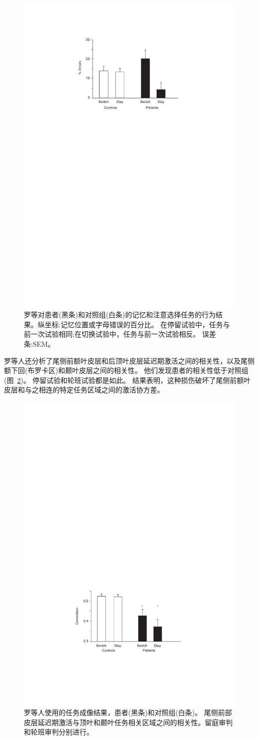 \begin{figure}[!htb]
	\centering
	\includegraphics[width=0.5\linewidth]{chap9/9_5}
	\caption{罗等对患者(黑条)和对照组(白条)的记忆和注意选择任务的行为结果。纵坐标:记忆位置或字母错误的百分比。
		在停留试验中，任务与前一次试验相同;在切换试验中，任务与前一次试验相反。
		误差条:SEM\cite{rowe2007prefrontal}。\label{fig:fig_9_5}}
\end{figure}

\par


罗等人还分析了尾侧前额叶皮层和后顶叶皮层延迟期激活之间的相关性，以及尾侧额下回(布罗卡区)和颞叶皮层之间的相关性。
他们发现患者的相关性低于对照组(图~\ref{fig:fig_9_6})。
停留试验和轮班试验都是如此。
结果表明，这种损伤破坏了尾侧前额叶皮层和与之相连的特定任务区域之间的激活协方差。
\par


\begin{figure}[!htb]
	\centering
	\includegraphics[width=0.5\linewidth]{chap9/9_6}
	\caption{罗等人使用的任务成像结果，患者(黑条)和对照组(白条)。
		尾侧前部皮层延迟期激活与顶叶和颞叶任务相关区域之间的相关性。留庭审判和轮班审判分别进行\cite{rowe2007prefrontal}。\label{fig:fig_9_6}}
\end{figure}

